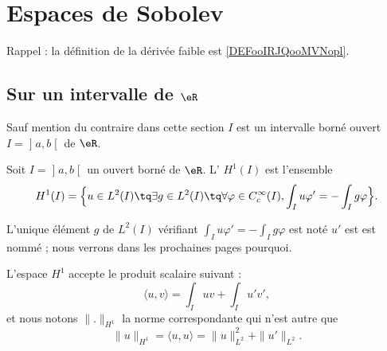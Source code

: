 
\section{Espaces de Sobolev}

Rappel : la définition de la dérivée faible est \ref{DEFooIRJQooMVNopl}.

\subsection{Sur un intervalle de \( \eR\)}

Sauf mention du contraire dans cette section \( I\) est un intervalle borné ouvert \( I=\mathopen] a , b \mathclose[\) de \( \eR\).

\begin{definition}
    Soit \( I=\mathopen] a , b \mathclose[\) un ouvert borné de \( \eR\). L' \( H^1(I)\) est l'ensemble
    \begin{equation}
        H^1(I)=\Big\{   u\in L^2(I)\tq\exists g\in L^2(I)\tq\forall \varphi\in  C^{\infty}_c(I),\int_Iu\varphi'=-\int_Ig\varphi   \Big\}.
    \end{equation}
\end{definition}

L'unique élément \( g\) de \( L^2(I)\) vérifiant \( \int_Iu\varphi'=-\int_Ig\varphi\) est noté \( u'\) est est nommé ; nous verrons dans les prochaines pages pourquoi.

L'espace \( H^1\) accepte le produit scalaire suivant :
\begin{equation}
    \langle u, v\rangle =\int_Iuv+\int_Iu'v',
\end{equation}
et nous notons \( \| . \|_{H^1}\) la norme correspondante qui n'est autre que
\begin{equation}
    \| u \|_{H^1}=\langle u, u\rangle =\| u \|^2_{L^2}+\| u' \|_{L^2}.
\end{equation}

